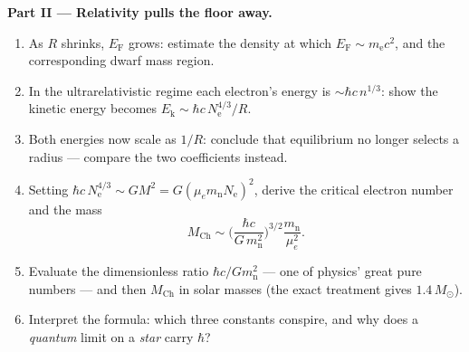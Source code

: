\begin{problem}
\medskip\noindent\textbf{Part II --- Relativity pulls the floor
away.}
\begin{enumerate}[resume]
  \item As $R$ shrinks, $E_{\text{F}}$ grows: estimate the density
        at which $E_{\text{F}} \sim m_{\text{e}}c^2$, and the
        corresponding dwarf mass region.
  \item In the ultrarelativistic regime each electron's energy is
        $\sim\hbar c\,n^{1/3}$: show the kinetic energy becomes
        $E_{\text{k}} \sim \hbar c\,N_{\text{e}}^{4/3}/R$.
  \item Both energies now scale as $1/R$: conclude that
        equilibrium no longer selects a radius --- compare the two
        coefficients instead.
  \item Setting $\hbar c\,N_{\text{e}}^{4/3} \sim
        GM^2 = G(\mu_em_{\text{n}}N_{\text{e}})^2$, derive the
        critical electron number and the mass
        \[
        M_{\text{Ch}} \sim
        \Big(\frac{\hbar c}{G\,m_{\text{n}}^2}\Big)^{3/2}
        \frac{m_{\text{n}}}{\mu_e^2} .
        \]
  \item Evaluate the dimensionless ratio $\hbar c/Gm_{\text{n}}^2$
        --- one of physics' great pure numbers --- and then
        $M_{\text{Ch}}$ in solar masses (the exact treatment gives
        $1.4\,M_\odot$).
  \item Interpret the formula: which three constants conspire, and
        why does a \emph{quantum} limit on a \emph{star} carry
        $\hbar$?
\end{enumerate}


\end{problem}

